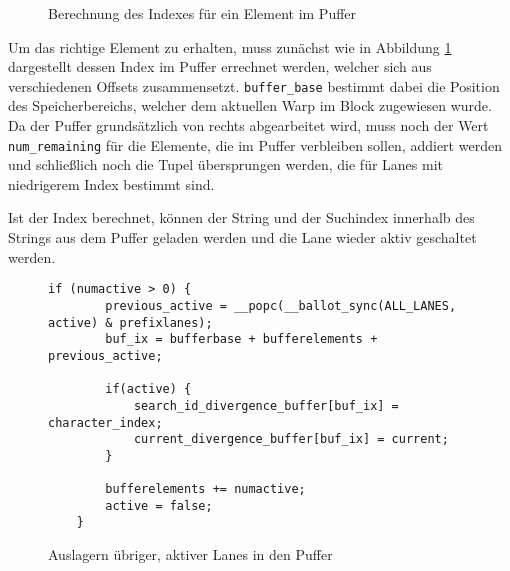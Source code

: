 \begin{figure}[ht]
	\caption{Berechnung des Indexes für ein Element im Puffer}
	\label{fig:buffer_index}
\end{figure}

Um das richtige Element zu erhalten, muss zunächst wie in Abbildung \ref{fig:buffer_index} dargestellt dessen Index im Puffer errechnet werden, welcher sich aus verschiedenen Offsets zusammensetzt.
\texttt{buffer\_base} bestimmt dabei die Position des Speicherbereichs, welcher dem aktuellen Warp im Block zugewiesen wurde.
Da der Puffer grundsätzlich von rechts abgearbeitet wird, muss noch der Wert \texttt{num\_remaining} für die Elemente, die im Puffer verbleiben sollen, addiert werden und schließlich noch die Tupel übersprungen werden, die für Lanes mit niedrigerem Index bestimmt sind.

Ist der Index berechnet, können der String und der Suchindex innerhalb des Strings aus dem Puffer geladen werden und die Lane wieder aktiv geschaltet werden.

\begin{figure}[ht]
	\begin{lstlisting}[language=MyC++]
	if (numactive > 0) {
		previous_active = __popc(__ballot_sync(ALL_LANES, active) & prefixlanes);
		buf_ix = bufferbase + bufferelements + previous_active;
		
		if(active) {
			search_id_divergence_buffer[buf_ix] = character_index;
			current_divergence_buffer[buf_ix] = current;
		}
		
		bufferelements += numactive;
		active = false;
	}
	\end{lstlisting}
	\caption{Auslagern übriger, aktiver Lanes in den Puffer}
	\label{flush_code}
\end{figure}

